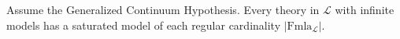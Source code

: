 \begin{corollary}[28.14 (GCH)]
\label{cor:gch-saturated-models-regular}
Assume the Generalized Continuum Hypothesis. Every theory in $\mathcal{L}$ with infinite models has a saturated model of each regular cardinality $|\mathrm{Fmla}_{\mathcal{L}}|$.
\end{corollary}
